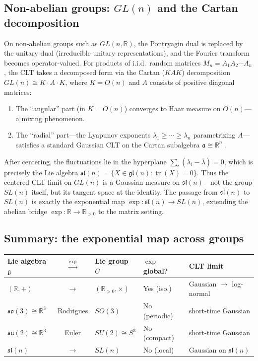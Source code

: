 \documentclass[12pt]{amsart}
\theoremstyle{definition}
\theoremstyle{remark}
\DeclareMathOperator{\tr}{tr}
\newcommand{\R}{\mathbb{R}}
\newcommand{\Rpos}{\mathbb{R}_{>0}}
\begin{document}
\subsection*{Non-abelian groups: $GL(n)$ and the Cartan decomposition}

On non-abelian groups such as $GL(n, \R)$, the Pontryagin dual is replaced by the unitary dual (irreducible unitary representations), and the Fourier transform becomes operator-valued. For products of i.i.d.\ random matrices $M_n = A_1 A_2 \cdots A_n$, the CLT takes a decomposed form via the Cartan ($KAK$) decomposition $GL(n) \cong K \cdot A \cdot K$, where $K = O(n)$ and $A$ consists of positive diagonal matrices:
\begin{enumerate}[label=(\roman*)]
\item The ``angular'' part (in $K = O(n)$) converges to Haar measure on $O(n)$---a mixing phenomenon.
\item The ``radial'' part---the Lyapunov exponents $\lambda_1 \geq \cdots \geq \lambda_n$ parametrizing $A$---satisfies a standard Gaussian CLT on the Cartan subalgebra $\mathfrak{a} \cong \R^n$ \cite{BQ}.
\end{enumerate}
After centering, the fluctuations lie in the hyperplane $\sum_i (\lambda_i - \bar{\lambda}) = 0$, which is precisely the Lie algebra $\mathfrak{sl}(n) = \{X \in \mathfrak{gl}(n) : \tr(X) = 0\}$. Thus the centered CLT limit on $GL(n)$ is a Gaussian measure on $\mathfrak{sl}(n)$---not the group $SL(n)$ itself, but its tangent space at the identity. The passage from $\mathfrak{sl}(n)$ to $SL(n)$ is exactly the exponential map $\exp : \mathfrak{sl}(n) \to SL(n)$, extending the abelian bridge $\exp : \R \to \Rpos$ to the matrix setting.

\subsection*{Summary: the exponential map across groups}

\begin{center}
\renewcommand{\arraystretch}{1.5}
\small
\begin{tabular}{lclll}
\textbf{Lie algebra $\mathfrak{g}$} & $\xrightarrow{\exp}$ & \textbf{Lie group $G$} & \textbf{$\exp$ global?} & \textbf{CLT limit} \\
\hline
$(\R, +)$ & $\to$ & $(\Rpos, \times)$ & Yes (iso.) & Gaussian $\to$ log-normal \\
$\mathfrak{so}(3) \cong \R^3$ & Rodrigues & $SO(3)$ & No (periodic) & short-time Gaussian \\
$\mathfrak{su}(2) \cong \R^3$ & Euler & $SU(2) \cong S^3$ & No (compact) & short-time Gaussian \\
$\mathfrak{sl}(n)$ & $\to$ & $SL(n)$ & No (local) & Gaussian on $\mathfrak{sl}(n)$
\end{tabular}
\end{center}
\end{document}
